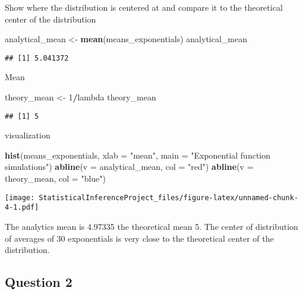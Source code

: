 \documentclass[
]{article}
\newenvironment{Shaded}{\begin{snugshade}}{\end{snugshade}}
\newcommand{\AttributeTok}[1]{\textcolor[rgb]{0.13,0.29,0.53}{#1}}
\newcommand{\DecValTok}[1]{\textcolor[rgb]{0.00,0.00,0.81}{#1}}
\newcommand{\FunctionTok}[1]{\textcolor[rgb]{0.13,0.29,0.53}{\textbf{#1}}}
\newcommand{\NormalTok}[1]{#1}
\newcommand{\OtherTok}[1]{\textcolor[rgb]{0.56,0.35,0.01}{#1}}
\newcommand{\SpecialCharTok}[1]{\textcolor[rgb]{0.81,0.36,0.00}{\textbf{#1}}}
\newcommand{\StringTok}[1]{\textcolor[rgb]{0.31,0.60,0.02}{#1}}
\begin{document}
Show where the distribution is centered at and compare it to the
theoretical center of the distribution

\begin{Shaded}
\begin{Highlighting}[]
\NormalTok{analytical\_mean }\OtherTok{\textless{}{-}} \FunctionTok{mean}\NormalTok{(means\_exponentials)}
\NormalTok{analytical\_mean}
\end{Highlighting}
\end{Shaded}

\begin{verbatim}
## [1] 5.041372
\end{verbatim}

Mean

\begin{Shaded}
\begin{Highlighting}[]
\NormalTok{theory\_mean }\OtherTok{\textless{}{-}} \DecValTok{1}\SpecialCharTok{/}\NormalTok{lambda}
\NormalTok{theory\_mean}
\end{Highlighting}
\end{Shaded}

\begin{verbatim}
## [1] 5
\end{verbatim}

visualization

\begin{Shaded}
\begin{Highlighting}[]
\FunctionTok{hist}\NormalTok{(means\_exponentials, }\AttributeTok{xlab =} \StringTok{"mean"}\NormalTok{, }\AttributeTok{main =} \StringTok{"Exponential function simulations"}\NormalTok{)}
\FunctionTok{abline}\NormalTok{(}\AttributeTok{v =}\NormalTok{ analytical\_mean, }\AttributeTok{col =} \StringTok{"red"}\NormalTok{)}
\FunctionTok{abline}\NormalTok{(}\AttributeTok{v =}\NormalTok{ theory\_mean, }\AttributeTok{col =} \StringTok{"blue"}\NormalTok{)}
\end{Highlighting}
\end{Shaded}

\texttt{[image: StatisticalInferenceProject\_files/figure-latex/unnamed-chunk-4-1.pdf]}

The analytics mean is 4.97335 the theoretical mean 5. The center of
distribution of averages of 30 exponentials is very close to the
theoretical center of the distribution.

\subsection{Question 2}\label{question-2}
\end{document}
